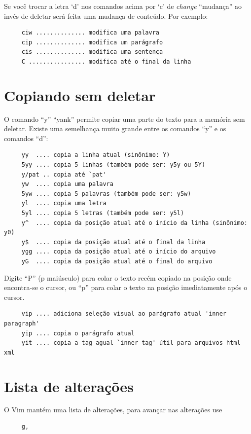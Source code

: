 \documentclass[10pt,a4paper,openany]{book}
\begin{document}
Se você trocar a letra `d' nos comandos acima por `c' de {\em change}
``mudança'' ao invés de deletar será feita uma mudança de conteúdo.
Por exemplo:

\begin{verbatim}
     ciw .............. modifica uma palavra
     cip .............. modifica um parágrafo
     cis .............. modifica uma sentença
     C ................ modifica até o final da linha
\end{verbatim}

\section{Copiando sem deletar}\label{Copiando sem deletar}

O comando ``y'' ``yank'' permite copiar uma parte do texto para a memória sem deletar.
Existe uma semelhança muito grande entre os comandos ``y'' e os comandos ``d'':

\begin{verbatim}
     yy  .... copia a linha atual (sinônimo: Y)
     5yy .... copia 5 linhas (também pode ser: y5y ou 5Y)
     y/pat .. copia até `pat'
     yw  .... copia uma palavra
     5yw .... copia 5 palavras (também pode ser: y5w)
     yl  .... copia uma letra
     5yl .... copia 5 letras (também pode ser: y5l)
     y^  .... copia da posição atual até o início da linha (sinônimo: y0)
     y$  .... copia da posição atual até o final da linha
     ygg .... copia da posição atual até o início do arquivo
     yG  .... copia da posição atual até o final do arquivo
\end{verbatim}

Digite ``P'' (p maiúsculo) para colar o texto recém copiado na posição onde
encontra-se o cursor, ou ``p'' para colar o texto na posição imediatamente
após o cursor.

\begin{verbatim}
     vip .... adiciona seleção visual ao parágrafo atual 'inner paragraph'
     yip .... copia o parágrafo atual
     yit .... copia a tag agual `inner tag' útil para arquivos html xml
\end{verbatim}

\section{Lista de alterações}
O Vim mantém uma lista de alterações, para avançar nas alterações use

\begin{verbatim}
     g,
\end{verbatim}
\end{document}
